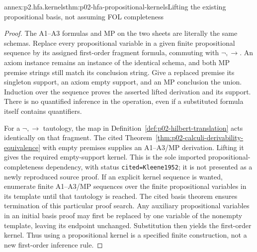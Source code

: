 \begin{annexitem}{annex:p2.hfa.kernels}{thm:p02-hfa-propositional-kernels}{Lifting the existing propositional basis, not assuming FOL completeness}
\begin{proof}
The A1--A3 formulas and MP on the two sheets are literally the same
schemas. Replace every propositional variable in a given finite
propositional sequence by its assigned first-order fragment formula,
commuting with \(\neg,\to\). An axiom instance remains an instance
of the identical schema, and both MP premise strings still match its
conclusion string. Give a replaced premise its singleton support, an
axiom empty support, and an MP conclusion the union. Induction over
the sequence proves the asserted lifted derivation and its support.
There is no quantified inference in the operation, even if a substituted
formula itself contains quantifiers.

For a \(\neg,\to\) tautology, the map in
Definition~\ref{def:p02-hilbert-translation} acts identically on that
fragment. The cited Theorem~\ref{thm:p02-calculi-derivability-equivalence}
with empty premises supplies an A1--A3/MP derivation. Lifting it gives
the required empty-support kernel. This is the sole imported
propositional-completeness dependency, with status \texttt{cited=Kleene1952};
it is not presented as a newly reproduced source proof. If an explicit
kernel sequence is wanted, enumerate finite A1--A3/MP sequences over
the finite propositional variables in its template until that tautology
is reached. The cited basis theorem ensures termination of this
particular proof search. Any auxiliary propositional variables in an
initial basis proof may first be replaced by one variable of the
nonempty template, leaving its endpoint unchanged. Substitution then yields the first-order
kernel. Thus using a propositional kernel is a specified finite
construction, not a new first-order inference rule.
\end{proof}
\end{annexitem}


